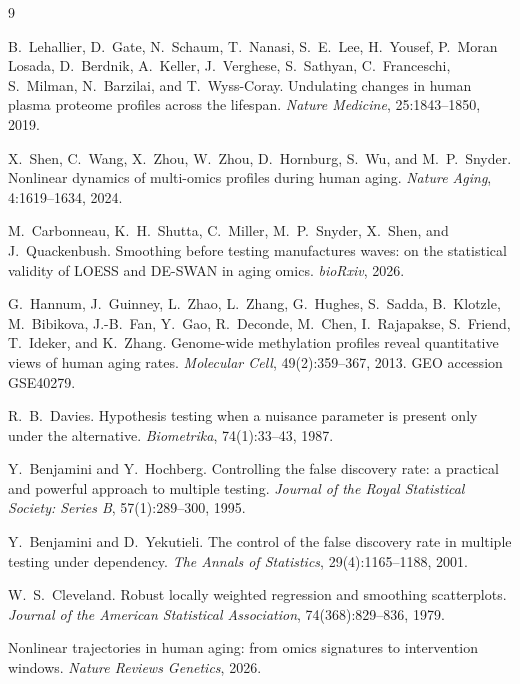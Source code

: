 \documentclass{article}
\begin{document}
\begin{thebibliography}{9}

B.~Lehallier, D.~Gate, N.~Schaum, T.~Nanasi, S.~E.~Lee, H.~Yousef, P.~Moran Losada, D.~Berdnik, A.~Keller, J.~Verghese, S.~Sathyan, C.~Franceschi, S.~Milman, N.~Barzilai, and T.~Wyss-Coray.
\newblock Undulating changes in human plasma proteome profiles across the lifespan.
\newblock \emph{Nature Medicine}, 25:1843--1850, 2019.

X.~Shen, C.~Wang, X.~Zhou, W.~Zhou, D.~Hornburg, S.~Wu, and M.~P.~Snyder.
\newblock Nonlinear dynamics of multi-omics profiles during human aging.
\newblock \emph{Nature Aging}, 4:1619--1634, 2024.

M.~Carbonneau, K.~H.~Shutta, C.~Miller, M.~P.~Snyder, X.~Shen, and J.~Quackenbush.
\newblock Smoothing before testing manufactures waves: on the statistical validity of LOESS and DE-SWAN in aging omics.
\newblock \emph{bioRxiv}, 2026.

G.~Hannum, J.~Guinney, L.~Zhao, L.~Zhang, G.~Hughes, S.~Sadda, B.~Klotzle, M.~Bibikova, J.-B.~Fan, Y.~Gao, R.~Deconde, M.~Chen, I.~Rajapakse, S.~Friend, T.~Ideker, and K.~Zhang.
\newblock Genome-wide methylation profiles reveal quantitative views of human aging rates.
\newblock \emph{Molecular Cell}, 49(2):359--367, 2013.
\newblock GEO accession GSE40279.

R.~B.~Davies.
\newblock Hypothesis testing when a nuisance parameter is present only under the alternative.
\newblock \emph{Biometrika}, 74(1):33--43, 1987.

Y.~Benjamini and Y.~Hochberg.
\newblock Controlling the false discovery rate: a practical and powerful approach to multiple testing.
\newblock \emph{Journal of the Royal Statistical Society: Series B}, 57(1):289--300, 1995.

Y.~Benjamini and D.~Yekutieli.
\newblock The control of the false discovery rate in multiple testing under dependency.
\newblock \emph{The Annals of Statistics}, 29(4):1165--1188, 2001.

W.~S.~Cleveland.
\newblock Robust locally weighted regression and smoothing scatterplots.
\newblock \emph{Journal of the American Statistical Association}, 74(368):829--836, 1979.

Nonlinear trajectories in human aging: from omics signatures to intervention windows.
\newblock \emph{Nature Reviews Genetics}, 2026.

\end{thebibliography}
\end{document}
